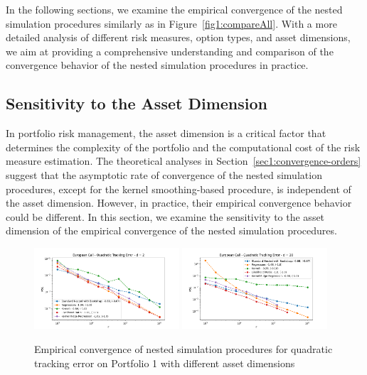 In the following sections, we examine the empirical convergence of the nested simulation procedures similarly as in Figure~\ref{fig1:compareAll}.
With a more detailed analysis of different risk measures, option types, and asset dimensions, we aim at providing a comprehensive understanding and comparison of the convergence behavior of the nested simulation procedures in practice.

\subsection{Sensitivity to the Asset Dimension}\label{sec1:sensitivity-dimension}
In portfolio risk management, the asset dimension is a critical factor that determines the complexity of the portfolio and the computational cost of the risk measure estimation.
The theoretical analyses in Section~\ref{sec1:convergence-orders} suggest that the asymptotic rate of convergence of the nested simulation procedures, except for the kernel smoothing-based procedure, is independent of the asset dimension.
However, in practice, their empirical convergence behavior could be different.
In this section, we examine the sensitivity to the asset dimension of the empirical convergence of the nested simulation procedures.

\begin{figure}[ht!]
    \centering
    \includegraphics[width=0.48\textwidth]{./project1/figures/figure2a.png}
    \includegraphics[width=0.48\textwidth]{./project1/figures/figure2b.png}
    \caption{Empirical convergence of nested simulation procedures for quadratic tracking error on Portfolio 1 with different asset dimensions}
\label{fig1:assetDimension} 
\end{figure}


